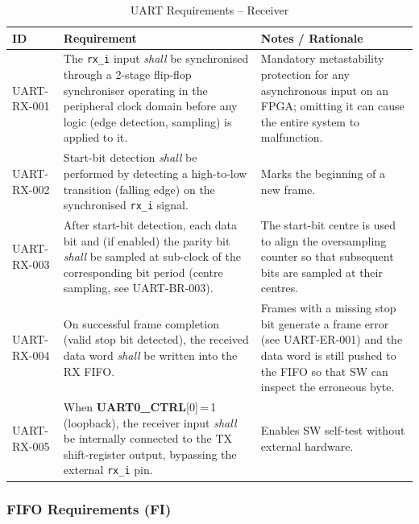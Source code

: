 \begin{table}[H]
\caption{UART Requirements -- Receiver}
\label{tab:asUartReqRX}
\centering
\begin{tabularx}{\textwidth}{|l |X |X|}
  \hline
  ID & Requirement & Notes / Rationale \\
  \hline
  \hline
  UART-RX-001 &
    The \texttt{rx\_i} input \textit{shall} be synchronised through a
    2-stage flip-flop synchroniser operating in the peripheral clock domain
    before any logic (edge detection, sampling) is applied to it. &
    Mandatory metastability protection for any asynchronous input on an
    FPGA; omitting it can cause the entire system to malfunction. \\
  \hline
  UART-RX-002 &
    Start-bit detection \textit{shall} be performed by detecting a
    high-to-low transition (falling edge) on the synchronised \texttt{rx\_i}
    signal. &
    Marks the beginning of a new frame. \\
  \hline
  UART-RX-003 &
    After start-bit detection, each data bit and (if enabled) the parity bit
    \textit{shall} be sampled at sub-clock\;8 of the corresponding bit
    period (centre sampling, see UART-BR-003). &
    The start-bit centre is used to align the oversampling counter so that
    subsequent bits are sampled at their centres. \\
  \hline
  UART-RX-004 &
    On successful frame completion (valid stop bit detected), the received
    data word \textit{shall} be written into the RX FIFO. &
    Frames with a missing stop bit generate a frame error (see UART-ER-001)
    and the data word is still pushed to the FIFO
    so that SW can inspect the erroneous byte. \\
  \hline
  UART-RX-005 &
    When \textbf{UART0\_CTRL}[0]\,=\,1 (loopback), the receiver input
    \textit{shall} be internally connected to the TX shift-register output,
    bypassing the external \texttt{rx\_i} pin. &
    Enables SW self-test without external hardware. \\
  \hline
\end{tabularx}
\end{table}

\subsubsection{FIFO Requirements (FI)}

